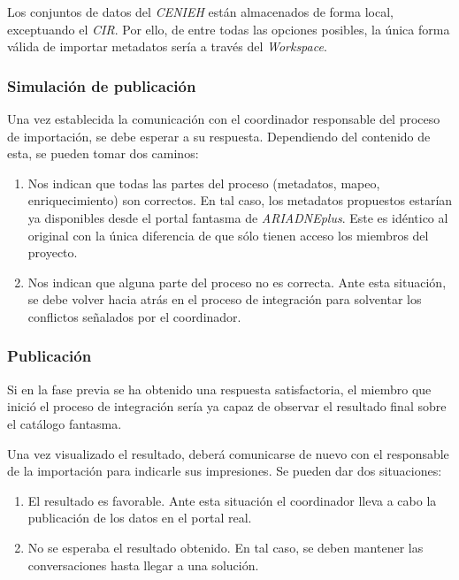 Los conjuntos de datos del \emph{CENIEH} están almacenados de forma local,
exceptuando el \emph{CIR}. Por ello, de entre todas las opciones posibles, la
única forma válida de importar metadatos sería a través del
\emph{Workspace}.

\subsubsection{Simulación de publicación}

Una vez establecida la comunicación con el coordinador responsable del
proceso de importación, se debe esperar a su respuesta. Dependiendo del
contenido de esta, se pueden tomar dos caminos:

\begin{enumerate}
\def\labelenumi{\arabic{enumi}.}
\tightlist
\item
  Nos indican que todas las partes del proceso (metadatos, mapeo,
  enriquecimiento) son correctos. En tal caso, los metadatos propuestos
  estarían ya disponibles desde el portal fantasma de \emph{ARIADNEplus}. Este
  es idéntico al original con la única diferencia de que sólo tienen
  acceso los miembros del proyecto.
\item
  Nos indican que alguna parte del proceso no es correcta. Ante esta
  situación, se debe volver hacia atrás en el proceso de integración
  para solventar los conflictos señalados por el coordinador.
\end{enumerate}

\subsubsection{Publicación}

Si en la fase previa se ha obtenido una respuesta satisfactoria, el
miembro que inició el proceso de integración sería ya capaz de observar
el resultado final sobre el catálogo fantasma. 

Una vez visualizado el resultado, deberá comunicarse de nuevo con el
responsable de la importación para indicarle sus impresiones. Se pueden
dar dos situaciones:

\begin{enumerate}
\def\labelenumi{\arabic{enumi}.}
\tightlist
\item
  El resultado es favorable. Ante esta situación el coordinador lleva a
  cabo la publicación de los datos en el portal real.
\item
  No se esperaba el resultado obtenido. En tal caso, se deben mantener
  las conversaciones hasta llegar a una solución.
\end{enumerate}

